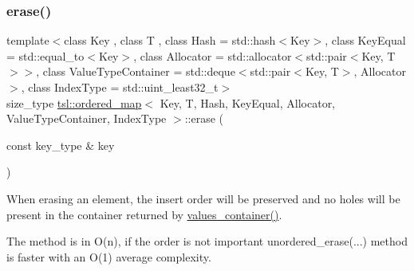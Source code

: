 \subsubsection{\texorpdfstring{erase()}{erase()}\hspace{0.1cm}{\footnotesize\ttfamily [4/7]}}
{\footnotesize\ttfamily template$<$class Key , class T , class Hash  = std\+::hash$<$\+Key$>$, class Key\+Equal  = std\+::equal\+\_\+to$<$\+Key$>$, class Allocator  = std\+::allocator$<$std\+::pair$<$\+Key, T$>$$>$, class Value\+Type\+Container  = std\+::deque$<$std\+::pair$<$\+Key, T$>$, Allocator$>$, class Index\+Type  = std\+::uint\+\_\+least32\+\_\+t$>$ \\
size\+\_\+type \mbox{\hyperlink{classtsl_1_1ordered__map}{tsl\+::ordered\+\_\+map}}$<$ Key, T, Hash, Key\+Equal, Allocator, Value\+Type\+Container, Index\+Type $>$\+::erase (\begin{DoxyParamCaption}\item[{const key\+\_\+type \&}]{key }\end{DoxyParamCaption})\hspace{0.3cm}{\ttfamily [inline]}}





When erasing an element, the insert order will be preserved and no holes will be present in the container returned by \textquotesingle{}\mbox{\hyperlink{classtsl_1_1ordered__map_abb69bca0a80def48ae806078d77175cb}{values\+\_\+container()}}\textquotesingle{}.

The method is in O(n), if the order is not important \textquotesingle{}unordered\+\_\+erase(...)\textquotesingle{} method is faster with an O(1) average complexity. \mbox{\label{classtsl_1_1ordered__map_af18a8b5ef294c869de50d133c2086072}} 
